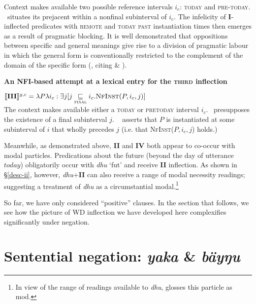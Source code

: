 Context makes available two possible reference intervals $ i_c $: \textsc{today} and \textsc{pre-today}. \III~situates its prejacent within a nonfinal subinterval of $ i_c $. The infelicity of \textbf{I}-inflected predicates with \textsc{remote} and \textsc{today past} instantiation times then emerges as a result of pragmatic blocking. It is well demonstrated that oppositions between specific and general meanings give rise to a division of pragmatic labour in which the general form is conventionally restricted to the complement of the domain of the specific form (\citealp{Deo2015}, citing \citealp{Horn1984} \& \citealp{Horn2012a}).

\pex\textbf{An NFI-based attempt at a lexical entry for the \textsc{third} inflection}

$ \denote[g,c]{\textbf{III}} = \lambda P\lambda i_c:\exists j[j\underset{\textsc{final}}{\sqsubseteq} i_c.\textsc{NfInst}(P,i_c,j)]$\\
The context makes available either a \textsc{today} or \textsc{pretoday} interval $ i_c $. \III~presupposes the existence of a final subinterval $ j $. \III~ asserts that $ P $ is instantiated at some subinterval of $ i $ that wholly precedes $ j $ (i.e. that \textsc{NfInst}($ P,i_c,j $) holds.)

\xe



Meanwhile, as demonstrated above, \textbf{II} and \textbf{IV} both appear to co-occur with modal particles. Predications about the future (beyond the day of utterance $ today $) obligatorily occur with \textit{dhu} `\gls{fut}' and receive \textbf{II} inflection. As shown in \S\ref{desc-ii}, however, \textit{dhu}+\textbf{II} can also receive a range of modal necessity readings; suggesting a treatment of \textit{dhu} as a circumstantial modal.\footnote{In view of the range of readings available to \textit{dhu}, \citet[110]{VanderWal1992} glosses this particle as \gls{mod}.}

So far, we have only considered ``positive'' clauses. In the section that follows, we see how the picture of WD inflection we have developed here complexifies significantly under negation.

\section{Sentential negation: \textit{yaka} \& \textit{bäyŋu}}\label{negs}


